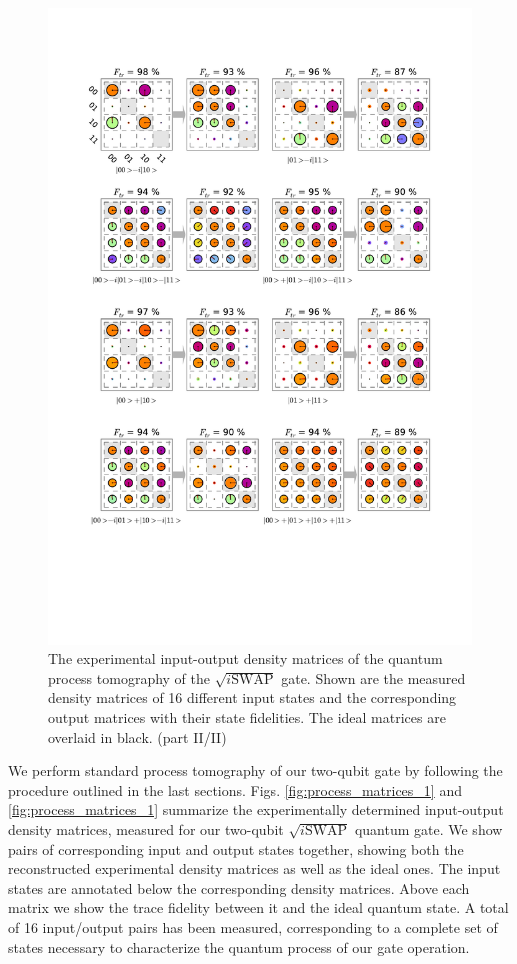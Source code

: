 \begin{figure}[p]
	\centering
		\includegraphics[width=1\textwidth]{"./data/ct5/2011_04_21 - grover and tomo/good_data/process -matrices 2"}
	\caption{The experimental input-output density matrices of the quantum process tomography of the $\sqrt{i\mathrm{SWAP}}$ gate. Shown are the measured density matrices of 16 different input states and the corresponding output matrices with their state fidelities. The ideal matrices are overlaid in black. (part II/II)}
	\label{fig:process_matrices_2}
\end{figure}

We perform standard process tomography of our two-qubit gate by following the procedure outlined in the last sections. Figs. \ref{fig:process_matrices_1} and \ref{fig:process_matrices_1} summarize the experimentally determined input-output density matrices, measured for our two-qubit $\sqrt{i\mathrm{SWAP}}$ quantum gate. We show pairs of corresponding input and output states together, showing both the reconstructed experimental density matrices as well as the ideal ones. The input states are annotated below the corresponding density matrices. Above each matrix we show the trace fidelity between it and the ideal quantum state. A total of 16 input/output pairs has been measured, corresponding to a complete set of states necessary to characterize the quantum process of our gate operation.

